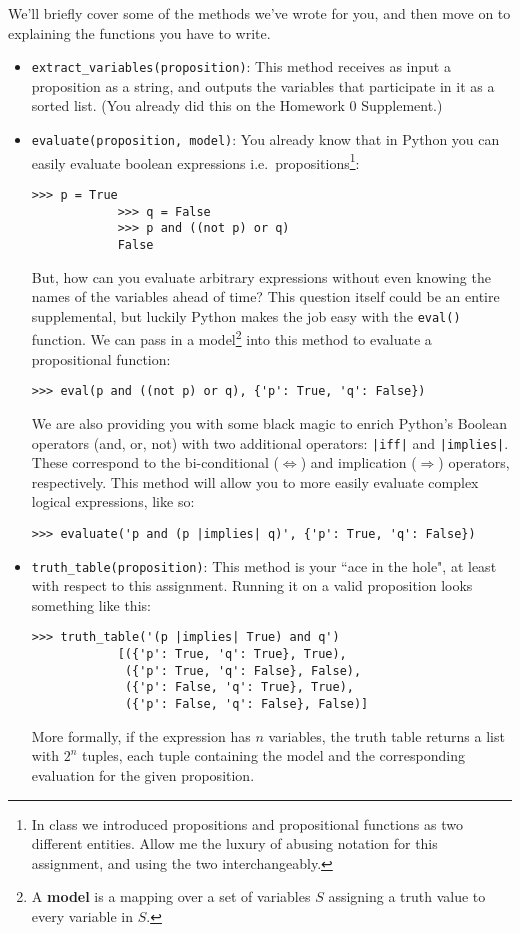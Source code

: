 \documentclass{article}
\begin{document}
    \vspace{3mm}
    We'll briefly cover some of the methods we've wrote for you, and then move on to explaining the functions you have to write.
    \begin{itemize}
        \item \verb+extract_variables(proposition)+: This method receives as input a proposition as a string, and outputs the variables that participate in it as a sorted list. (You already did this on the Homework 0 Supplement.)
        \item \verb+evaluate(proposition, model)+: You already know that in Python you can easily evaluate boolean expressions i.e.\ propositions\footnote{In class we introduced propositions and propositional functions as two different entities. Allow me the luxury of abusing notation for this assignment, and using the two interchangeably.}:
        \begin{lstlisting}[belowskip=-10pt]
            >>> p = True
            >>> q = False
            >>> p and ((not p) or q)
            False
        \end{lstlisting}
        But, how can you evaluate arbitrary expressions without even knowing the names of the variables ahead of time? This question itself could be an entire supplemental, but luckily Python makes the job easy with the \verb+eval()+ function. We can pass in a model\footnote{A \textbf{model} is a mapping over a set of variables $S$ assigning a truth value to every variable in $S$.} into this method to evaluate a propositional function:
        \begin{lstlisting}[belowskip=-10pt]
            >>> eval(p and ((not p) or q), {'p': True, 'q': False})
        \end{lstlisting}
        We are also providing you with some black magic to enrich Python’s Boolean operators (and, or, not) with two additional operators: \verb+|iff|+ and \verb+|implies|+. These correspond to the bi-conditional ($\Leftrightarrow$) and implication ($\Rightarrow$) operators, respectively. This method will allow you to more easily evaluate complex logical expressions, like so:
        \begin{lstlisting}[belowskip=-10pt]
            >>> evaluate('p and (p |implies| q)', {'p': True, 'q': False})
        \end{lstlisting}
        \item \verb+truth_table(proposition)+: This method is your ``ace in the hole", at least with respect to this assignment. Running it on a valid proposition looks something like this:
        \begin{lstlisting}[belowskip=-10pt]
            >>> truth_table('(p |implies| True) and q')
            [({'p': True, 'q': True}, True), 
             ({'p': True, 'q': False}, False), 
             ({'p': False, 'q': True}, True), 
             ({'p': False, 'q': False}, False)]
        \end{lstlisting}
        More formally, if the expression has $n$ variables, the truth table returns a list with $2^{n}$ tuples, each tuple containing the model and the corresponding evaluation for the given proposition.
    \end{itemize}
    
\end{document}
